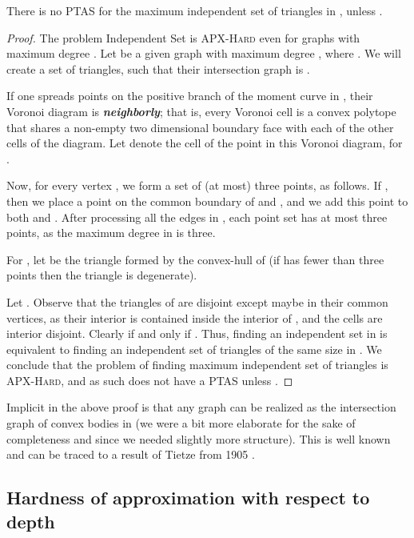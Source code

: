 \documentclass[12pt]{article}
\newcommand{\Term}[1]{\textsf{#1}}
\newcommand{\emphic}[2]{\textcolor{blue25}{\textbf{\emph{#1}}}\index{#2}}
\renewcommand{\emphic}[2]{\textbf{\emph{#1}}}
\newcommand{\emphi}[1]{\emphic{#1}{#1}}
\theoremstyle{remark}\theoremheaderfont{\sf}\theorembodyfont{\upshape}
\numberwithin{figure}{section}\numberwithin{table}{section}\numberwithin{equation}{section}
\newcommand{\lemlab}[1]{\label{lemma:#1}}
\newcommand{\ProblemC}[1]{\textsf{#1}}
\providecommand{\ComplexityClass}[1]{{{\textcolor[named]{ColorComplexityClass}{\textsc{#1}}}}}
\newcommand{\PTAS}{\Term{PTAS}\xspace}
\newcommand{\APXHard}{\ComplexityClass{APX-Hard}\xspace}
\begin{document}
\begin{lemma}
  \lemlab{no:PTAS:3:d:i:s}There is no \PTAS for the maximum independent set of triangles in
  , unless .
\end{lemma}
\begin{proof}
  The problem \ProblemC{Independent Set} is \APXHard even for graphs
  with maximum degree  \cite{acgkm-ca-99}. Let
   be a given graph with maximum degree
  , where .  We will create a
  set of triangles, such that their intersection graph is .

  If one spreads  points  on the positive
  branch of the moment curve in  \cite{s-eubnf-91,
    ek-alnfc-03}, their Voronoi diagram is \emphi{neighborly}; that
  is, every Voronoi cell is a convex polytope that shares a non-empty
  two dimensional boundary face with each of the other cells of the
  diagram. Let  denote the cell of the point  in this
  Voronoi diagram, for .

  Now, for every vertex , we form a set 
  of (at most) three points, as follows. If , then
  we place a point  on the common boundary of  and ,
  and we add this point to both  and .  After
  processing all the edges in , each point set  has
  at most three points, as the maximum degree in  is three.

  For , let  be the triangle formed by the
  convex-hull of  (if  has fewer than three
  points then the triangle is degenerate).

  Let .  Observe that the triangles
  of  are disjoint except maybe in their common vertices, as
  their interior is contained inside the interior of , and the
  cells  are interior disjoint. Clearly
   if and only if . Thus,
  finding an independent set in  is equivalent to finding an
  independent set of triangles of the same size in . We
  conclude that the problem of finding maximum independent set of
  triangles is \APXHard, and as such does not have a \PTAS unless
  .
\end{proof}


Implicit in the above proof is that any graph can be realized as the
intersection graph of convex bodies in  (we were a bit more
elaborate for the sake of completeness and since we needed slightly
more structure). This is well known and can be traced to a result of
Tietze from 1905 \cite{t-upnr-05}.


\subsection{Hardness of approximation with respect to depth}
\end{document}
